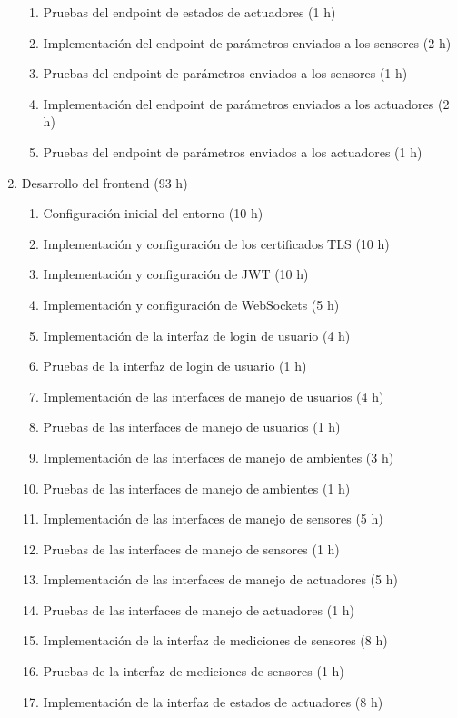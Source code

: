 \begin{enumerate}
\begin{enumerate}
		      \item Pruebas del endpoint de estados de actuadores (1 h)
		      \item Implementación del endpoint de parámetros enviados a los sensores (2 h)
		      \item Pruebas del endpoint de parámetros enviados a los sensores (1 h)
		      \item Implementación del endpoint de parámetros enviados a los actuadores (2 h)
		      \item Pruebas del endpoint de parámetros enviados a los actuadores (1 h)
	      \end{enumerate}
	\item Desarrollo del frontend (93 h)
	      \begin{enumerate}
		      \item Configuración inicial del entorno (10 h)
		      \item Implementación y configuración de los certificados TLS (10 h)
		      \item Implementación y configuración de JWT (10 h)
		      \item Implementación y configuración de WebSockets (5 h)
		      \item Implementación de la interfaz de login de usuario (4 h)
		      \item Pruebas de la interfaz de login de usuario (1 h)
		      \item Implementación de las interfaces de manejo de usuarios (4 h)
		      \item Pruebas de las interfaces de manejo de usuarios (1 h)
		      \item Implementación de las interfaces de manejo de ambientes (3 h)
		      \item Pruebas de las interfaces de manejo de ambientes (1 h)
		      \item Implementación de las interfaces de manejo de sensores (5 h)
		      \item Pruebas de las interfaces de manejo de sensores (1 h)
		      \item Implementación de las interfaces de manejo de actuadores (5 h)
		      \item Pruebas de las interfaces de manejo de actuadores (1 h)
		      \item Implementación de la interfaz de mediciones de sensores (8 h)
		      \item Pruebas de la interfaz de mediciones de sensores (1 h)
		      \item Implementación de la interfaz de estados de actuadores (8 h)

\end{enumerate}
\end{enumerate}
